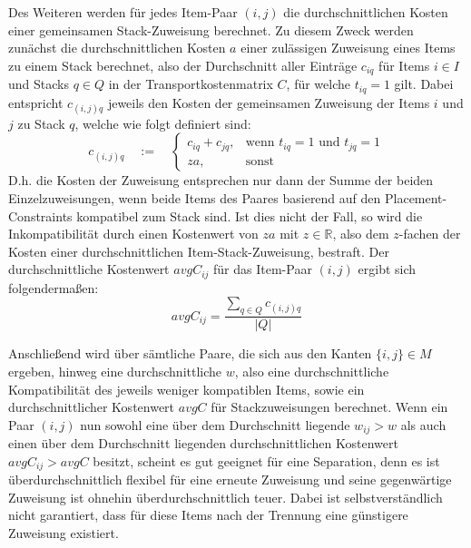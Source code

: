 Des Weiteren werden für jedes Item-Paar $(i, j)$ die durchschnittlichen Kosten einer gemeinsamen Stack-Zuweisung berechnet.
Zu diesem Zweck werden zunächst die durchschnittlichen Kosten $a$ einer zulässigen Zuweisung eines Items zu einem Stack berechnet,
also der Durchschnitt aller Einträge $c_{iq}$ für Items $i \in I$ und Stacks $q \in Q$ in der Transportkostenmatrix $C$, für
welche $t_{iq} = 1$ gilt. Dabei entspricht $c_{(i, j)q}$ jeweils den Kosten der gemeinsamen Zuweisung der Items $i$ und $j$ zu Stack $q$,
welche wie folgt definiert sind:
\[
    c_{(i, j)q} \quad := \quad
\begin{cases}
    c_{iq} + c_{jq}, & \text{wenn $t_{iq} = 1$ und $t_{jq} = 1$}\\
    za, & \text{sonst}
\end{cases}
\]
D.h. die Kosten der Zuweisung entsprechen nur dann der Summe der beiden Einzelzuweisungen, wenn beide Items des Paares basierend
auf den Placement-Constraints kompatibel zum Stack sind. Ist dies nicht der Fall, so wird die Inkompatibilität durch
einen Kostenwert von $za$ mit $z \in \mathbb{R}$, also dem $z$-fachen der Kosten einer durchschnittlichen Item-Stack-Zuweisung, bestraft. Der durchschnittliche Kostenwert $avgC_{ij}$ für das Item-Paar $(i, j)$ ergibt sich folgendermaßen:
\[ avgC_{ij} = \frac{\sum_{q \in Q} c_{(i, j)q}}{|Q|}  \]

Anschließend wird über sämtliche Paare, die sich aus den Kanten $\{i, j\} \in M$ ergeben, hinweg eine durchschnittliche  $w$, also eine durchschnittliche Kompatibilität des jeweils weniger kompatiblen Items, sowie ein durchschnittlicher Kostenwert $avgC$ für Stackzuweisungen berechnet. Wenn ein Paar $(i, j)$ nun sowohl eine über dem Durchschnitt liegende  $w_{ij} > w$ als auch einen über dem Durchschnitt liegenden durchschnittlichen Kostenwert $avgC_{ij} > avgC$ besitzt, scheint es gut geeignet für eine Separation,
denn es ist überdurchschnittlich flexibel für eine erneute Zuweisung und seine gegenwärtige Zuweisung ist ohnehin überdurchschnittlich teuer.
Dabei ist selbstverständlich nicht garantiert, dass für diese Items nach der Trennung eine günstigere Zuweisung existiert.

